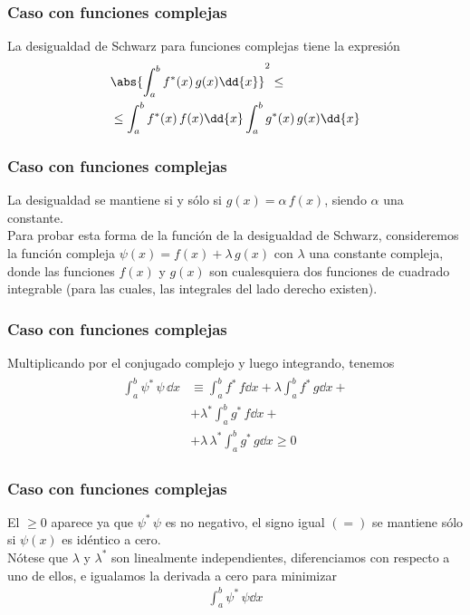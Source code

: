 \begin{frame}
\frametitle{Caso con funciones complejas}
La desigualdad de Schwarz para funciones complejas tiene la expresión
\begin{align}
\begin{aligned}
&\abs{ \int_{a}^{b} f^{*} (x) \, g(x) \dd{x} }^{2} \leq \\
&\leq \int_{a}^{b} f^{*}(x) \, f(x) \dd{x} \int_{a}^{b} g^{*}(x) \, g(x) \dd{x}
\end{aligned}
\label{eq:ecuacion_10_78}
\end{align}
\end{frame}
\begin{frame}
\frametitle{Caso con funciones complejas}
La desigualdad se mantiene si y sólo si $g(x) = \alpha \, f(x)$, siendo $\alpha$ una constante.
\\
\bigskip
\pause
Para probar esta forma de la función de la desigualdad de Schwarz, consideremos la función compleja $\psi(x) = f(x) + \lambda \, g(x)$ con $\lambda$ una constante compleja, donde las funciones $f(x)$ y $g(x)$ son cualesquiera dos funciones de cuadrado integrable (para las cuales, las integrales del lado derecho existen).
\end{frame}
\begin{frame}
\frametitle{Caso con funciones complejas}
Multiplicando por el conjugado complejo y luego integrando, tenemos
\begin{align}
\begin{aligned}
\int_{a}^{b} \psi^{*} \, \psi \, \dd{x} &\equiv \int_{a}^{b} f^{*} \, f \dd{x} + \lambda \int_{a}^{b} f^{*} \, g \dd{x} + \\
&+ \lambda^{*} \int_{a}^{b} g^{*} \, f \dd{x} + \\
&+ \lambda \, \lambda^{*} \int_{a}^{b} g^{*} \, g \dd{x}  \geq 0
\end{aligned}
\label{eq:ecuacion_10_79}
\end{align}
\end{frame}
\begin{frame}
\frametitle{Caso con funciones complejas}
El $\geq 0$ aparece ya que $\psi^{*} \, \psi$ es no negativo, el signo igual $(=)$ se mantiene sólo si $\psi (x)$ es idéntico a cero. 
\\
\bigskip
\pause
Nótese que $\lambda$ y $\lambda^{*}$ son linealmente independientes, diferenciamos con respecto a uno de ellos, e igualamos la derivada a cero para minimizar
\begin{align*}
\int_{a}^{b} \psi^{*} \, \psi \dd{x}
\end{align*}
\end{frame}
